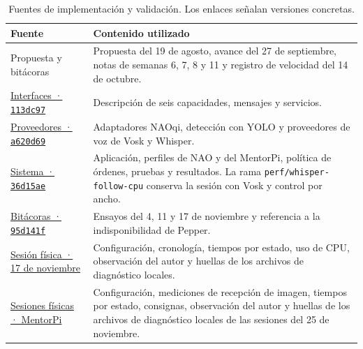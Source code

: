 \documentclass[11pt,letterpaper]{article}
\newcommand{\code}[1]{\nolinkurl{#1}}
\begin{document}
\begin{table}[htbp]
\centering\small
\caption{Fuentes de implementación y validación. Los enlaces señalan versiones concretas.}\label{tab:fuentes}
\begin{tabularx}{\linewidth}{@{}P{3.8cm}Y@{}}
\toprule
Fuente & Contenido utilizado \\
\midrule
Propuesta y bitácoras & Propuesta del 19 de agosto, avance del 27 de septiembre, notas de semanas 6, 7, 8 y 11 y registro de velocidad del 14 de octubre. \\
\href{https://github.com/jumafe1/portable-hri-interfaces/tree/113dc9752113749ba2252f59d3f0fbeeccbde5a7}{Interfaces · \texttt{113dc97}} & Descripción de seis capacidades, mensajes y servicios. \\
\href{https://github.com/jumafe1/portable-hri-providers/tree/a620d692f6a26f2d8355c4912bfd5ae6915c4b8b}{Proveedores · \texttt{a620d69}} & Adaptadores NAOqi, detección con YOLO y proveedores de voz de Vosk y Whisper. \\
\href{https://github.com/jumafe1/portable-hri-reference-system/tree/36d15ae19070a4dab487089e9ee80399f8a9a398}{Sistema · \texttt{36d15ae}} & Aplicación, perfiles de NAO y del MentorPi, política de órdenes, pruebas y resultados. La rama \code{perf/whisper-follow-cpu} conserva la sesión con Vosk y control por ancho. \\
\href{https://github.com/jumafe1/portable-hri-docs/tree/95d141fb41f1b144b6ff70ff9993794293875940}{Bitácoras · \texttt{95d141f}} & Ensayos del 4, 11 y 17 de noviembre y referencia a la indisponibilidad de Pepper. \\
\href{https://github.com/jumafe1/portable-hri-reference-system/blob/910c05faed6aa0c4b02872cb7f4f65ebf25ce669/results/follow_width_voice_20261117.json}{Sesión física · 17 de noviembre} & Configuración, cronología, tiempos por estado, uso de CPU, observación del autor y huellas de los archivos de diagnóstico locales. \\
\href{https://github.com/jumafe1/portable-hri-reference-system/blob/36d15ae19070a4dab487089e9ee80399f8a9a398/results/follow_mentorpi_20261125.json}{Sesiones físicas · MentorPi} & Configuración, mediciones de recepción de imagen, tiempos por estado, consignas, observación del autor y huellas de los archivos de diagnóstico locales de las sesiones del 25 de noviembre. \\
\bottomrule
\end{tabularx}
\end{table}

\FloatBarrier
\clearpage
\end{document}
